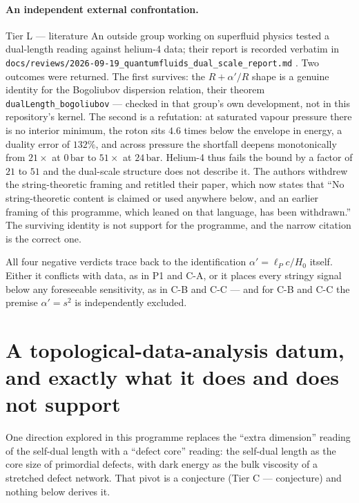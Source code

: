 \documentclass[11pt,a4paper]{article}
\theoremstyle{remark}
\newcommand{\tierL}{\colorbox{blue!10}{\textsf{\scriptsize Tier L --- literature}}}
\newcommand{\tierC}{\colorbox{orange!15}{\textsf{\scriptsize Tier C --- conjecture}}}
\newcommand{\lean}[1]{\texttt{#1}}
\begin{document}
\paragraph{An independent external confrontation.}
\tierL{} An outside group working on superfluid physics tested a dual-length reading against
helium-4 data; their report is recorded verbatim in
\lean{docs/reviews/2026-09-19\_quantumfluids\_dual\_scale\_report.md} \cite{QuantumFluids2026}. Two
outcomes were returned. The first survives: the $R + \alpha'/R$ shape is a genuine identity for
the Bogoliubov dispersion relation, their theorem \lean{dualLength\_bogoliubov} --- checked in
that group's own development, not in this repository's kernel. The second is a
refutation: at saturated vapour pressure there is no interior minimum, the roton sits $4.6$
times below the envelope in energy, a duality error of $132\%$, and across pressure the
shortfall deepens monotonically from $21\times$ at $0\,\mathrm{bar}$ to $51\times$ at
$24\,\mathrm{bar}$. Helium-4 thus fails the bound by a factor of $21$ to $51$ and the dual-scale
structure does not describe it. The authors withdrew the string-theoretic framing and retitled
their paper, which now states that ``No string-theoretic content is claimed or used anywhere
below, and an earlier framing of this programme, which leaned on that language, has been
withdrawn.'' The surviving identity is not support for the programme, and the narrow citation is
the correct one.

\begin{headlinebox}
All four negative verdicts trace back to the identification $\alpha' = \ell_P c/H_0$ itself.
Either it conflicts with data, as in P1 and C-A, or it places every stringy signal below any
foreseeable sensitivity, as in C-B and C-C --- and for C-B and C-C the premise $\alpha' = s^2$
is independently excluded.
\end{headlinebox}


\section{A topological-data-analysis datum, and exactly what it does and does not support}\label{sec:tda}

One direction explored in this programme replaces the ``extra dimension'' reading of the self-dual length with a ``defect core'' reading: the self-dual length as the core size of primordial defects, with dark energy as the bulk viscosity of a stretched defect network. That pivot is a conjecture (\tierC) and nothing below derives it.
\end{document}
